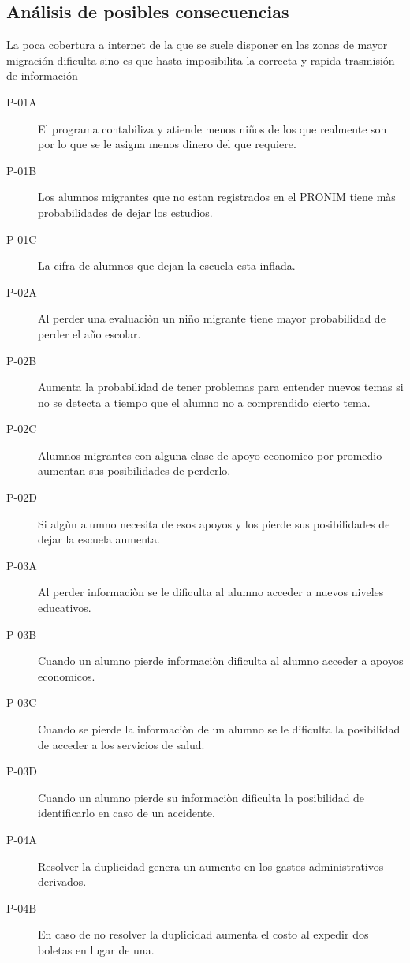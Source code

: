\subsection{Análisis de posibles consecuencias}
La poca cobertura a internet de la que se suele disponer en las zonas de mayor migración dificulta sino es que hasta imposibilita la correcta y rapida trasmisión de información
\begin{description}

	\item[P-01A] El programa contabiliza y atiende menos niños de los que realmente son por lo que se le asigna menos dinero del que requiere.
	\item[P-01B] Los alumnos migrantes que no estan registrados en el PRONIM tiene màs probabilidades de dejar los estudios.
     \item[P-01C] La cifra de alumnos que dejan la escuela esta inflada.
     \item[P-02A] Al perder una evaluaciòn un niño migrante tiene mayor probabilidad de perder el año escolar.
	\item[P-02B] Aumenta la probabilidad de tener problemas para entender nuevos temas si no se detecta a tiempo que el alumno no a comprendido cierto tema.
     \item[P-02C] Alumnos migrantes con alguna clase de apoyo economico por promedio aumentan sus posibilidades de perderlo.
     \item[P-02D] Si algùn alumno necesita de esos apoyos y los pierde sus posibilidades de dejar la escuela aumenta.
     \item[P-03A] Al perder informaciòn se le dificulta al alumno acceder a nuevos niveles educativos.
	\item[P-03B] Cuando un alumno pierde informaciòn dificulta al alumno acceder a apoyos economicos.
     \item[P-03C] Cuando se pierde la informaciòn de un alumno se le dificulta la posibilidad de acceder a los servicios de salud.
     \item[P-03D] Cuando un alumno pierde su informaciòn dificulta la posibilidad de identificarlo en caso de un accidente.
     \item[P-04A] Resolver la duplicidad genera un aumento en los gastos administrativos derivados.
    \item[P-04B] En caso de no resolver la duplicidad aumenta el costo al expedir dos boletas en lugar de una.

\end{description}
